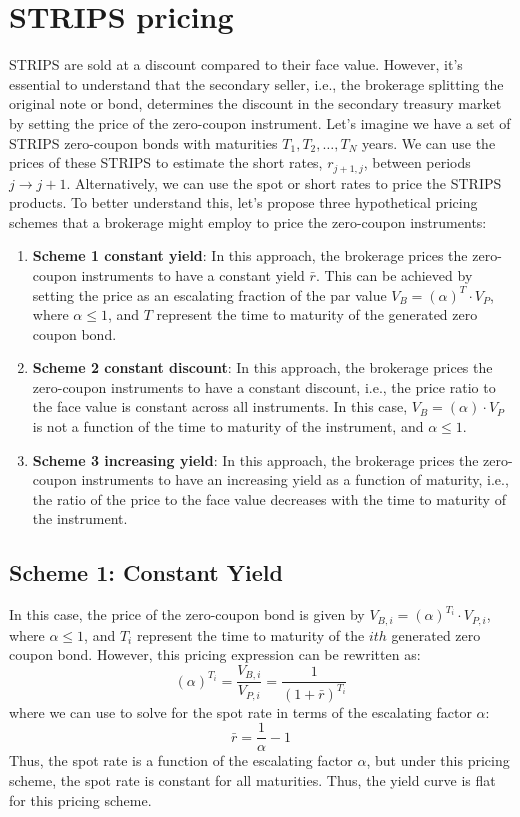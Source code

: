 \documentclass[11pt]{article}
\theoremstyle{definition}
\begin{document}
\section*{STRIPS pricing}
STRIPS are sold at a discount compared to their face value. However, it's essential to understand that the secondary seller, i.e., the brokerage splitting the original note or bond, determines the discount in the secondary treasury market by setting the price of the zero-coupon instrument. Let's imagine we have a set of STRIPS zero-coupon bonds with maturities $T_{1}, T_{2},\ldots, T_{N}$ years. 
We can use the prices of these STRIPS to estimate the short rates, $r_{j+1,j}$, between periods $j\rightarrow{j+1}$.
Alternatively, we can use the spot or short rates to price the STRIPS products. 
To better understand this, let's propose three hypothetical pricing schemes that a brokerage might employ to price the zero-coupon instruments:
\begin{enumerate}
\item{\textbf{Scheme 1 constant yield}: In this approach, the brokerage prices the zero-coupon instruments to have a constant yield $\bar{r}$. This can be achieved by setting the price as an escalating fraction of the par value $V_{B} = \left(\alpha\right)^{T}\cdot{V}_{P}$, where $\alpha\leq{1}$, and $T$ represent the time to maturity of the generated zero coupon bond.}
\item{\textbf{Scheme 2 constant discount}: In this approach, the brokerage prices the zero-coupon instruments to have a constant discount, i.e., the price ratio to the face value is constant across all instruments. In this case, $V_{B} = \left(\alpha\right)\cdot{V}_{P}$ is not a function of the time to maturity of the instrument, and $\alpha\leq{1}$.}
\item{\textbf{Scheme 3 increasing yield}: In this approach, the brokerage prices the zero-coupon instruments to have an increasing yield as a function of maturity, i.e., the ratio of the price to the face value decreases with the time to maturity of the instrument.}
\end{enumerate}

\subsection*{Scheme 1: Constant Yield}
In this case, the price of the zero-coupon bond is given by $V_{B, i} = \left(\alpha\right)^{T_{i}}\cdot{V}_{P, i}$, where $\alpha\leq{1}$, and $T_{i}$ represent the time to maturity of the $ith$ generated zero coupon bond. However, this pricing expression can be rewritten as:
\begin{equation}
\left(\alpha\right)^{T_{i}} = \frac{V_{B,i}}{V_{P,i}} = \frac{1}{\left(1+\bar{r}\right)^{T_{i}}}
\end{equation}
where we can use to solve for the spot rate in terms of the escalating factor $\alpha$:
\begin{equation}
\bar{r} = \frac{1}{\alpha} - 1
\end{equation}
Thus, the spot rate is a function of the escalating factor $\alpha$, but under this pricing scheme, 
the spot rate is constant for all maturities. Thus, the yield curve is flat for this pricing scheme.
\end{document}
